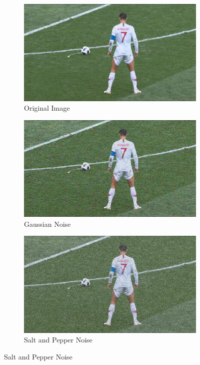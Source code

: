 \documentclass[10pt,twocolumn,letterpaper]{article}
\begin{document}
\begin{figure}
\centering
\begin{subfigure}[b]{0.5\columnwidth}
\includegraphics[width=\columnwidth]{Images/Image.jpg}
\caption{Original Image}
\end{subfigure}

\begin{subfigure}[b]{0.495\columnwidth}
\includegraphics[width=\columnwidth]{Images/Gaussian_Noise.png}
\caption{Gaussian Noise}
\end{subfigure}
\begin{subfigure}[b]{0.495\columnwidth}
\includegraphics[width=\columnwidth]{Images/Salt_and_Pepper_Noise.png}
\caption{Salt and Pepper Noise}
\end{subfigure}


\end{figure}
\end{document}
